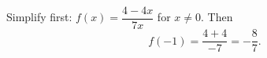 Simplify first: $f(x)=\dfrac{4-4x}{7x}$ for $x\ne0$. Then
\[
f(-1)=\dfrac{4+4}{-7}=\boxed{-\dfrac{8}{7}}.
\]
